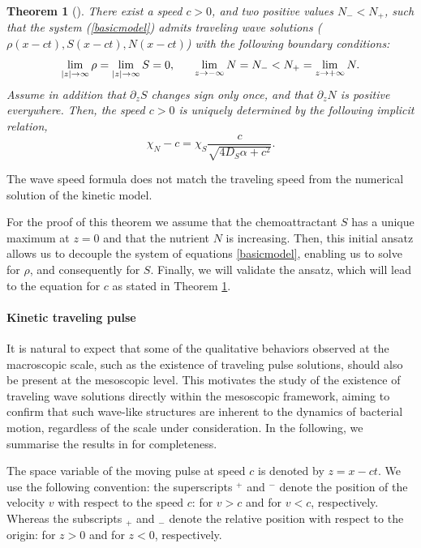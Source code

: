\documentclass[11pt,twoside]{article}
\numberwithin{equation}{section}
\theoremstyle{plain}
\newtheorem{theorem}{Theorem}[section]
\theoremstyle{nonumberplain}
\begin{document}
{\begin{theorem}[\cite{calvez2019chemotactic}]\label{thmacro}
There exist a speed $c>0$, and two positive values $N_- < N_+$, such that the system (\ref{basicmodel}) admits traveling wave solutions ($\rho (x- c t), S(x - c t), N(x - c t)$) with the following boundary conditions:
\begin{equation}
    \lim_{|z| \to \infty} \rho = \lim_{|z| \to \infty} S = 0, \hspace{0.6cm} \lim_{z \to -\infty} N = N_- < N_+ = \lim_{z \to + \infty} N.
    \nonumber
\end{equation}
Assume in addition that $\partial_z S$ changes sign only once, and that $\partial_z N$ is positive everywhere. Then, the speed $c > 0$ is uniquely determined by the following implicit relation,
\[
\chi_N - c = \chi_S \frac{c}{\sqrt{4 D_S \alpha + c^2}}.
\]
\end{theorem}
{\color{red} The wave speed formula does not match the traveling speed from the numerical solution of the kinetic model.}

For the proof of this theorem we assume that the chemoattractant $S$ has a unique maximum at $z = 0$ and that the nutrient $N$ is increasing. Then, this initial ansatz allows us to decouple the system of equations \eqref{basicmodel}, enabling us to solve for $\rho$, and consequently for $S$. Finally, we will validate the ansatz, which will lead to the equation for $c$ as stated in Theorem \ref{thmacro}.

\paragraph{Kinetic traveling pulse} It is natural to expect that some of the qualitative behaviors observed at the macroscopic scale, such as the existence of traveling pulse solutions, should also be present at the mesoscopic level. This motivates the study of the existence of traveling wave solutions directly within the mesoscopic framework, aiming to confirm that such wave-like structures are inherent to the dynamics of bacterial motion, regardless of the scale under consideration.
In the following, we summarise the results in \cite{calvez2019chemotactic} for completeness.

The space variable of the moving pulse at speed $c$ is denoted by $z = x-ct$.
We use the following convention: the superscripts $^+$ and $^-$ denote the position of the velocity $v$ with respect to the speed $c$: for $v>c$ and for $v<c$, respectively. Whereas the subscripts $_+$ and $_-$ denote the relative position with respect to the origin: for $z>0$ and for $z<0$, respectively. 


}
\end{document}
